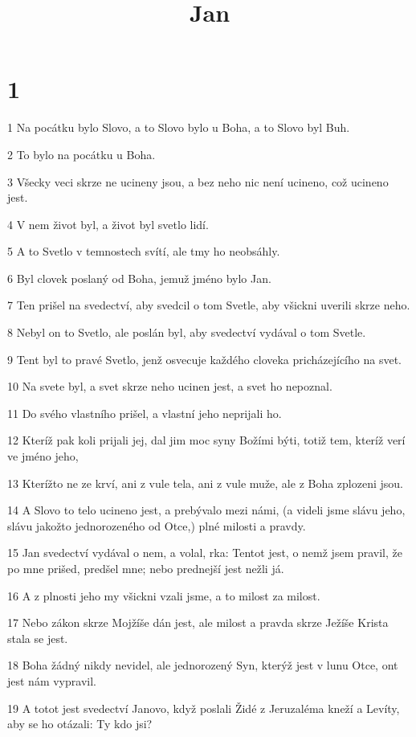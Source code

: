 

\title{Jan}

\chapter{1}

\par 1 Na pocátku bylo Slovo, a to Slovo bylo u Boha, a to Slovo byl Buh.
\par 2 To bylo na pocátku u Boha.
\par 3 Všecky veci skrze ne ucineny jsou, a bez neho nic není ucineno, což ucineno jest.
\par 4 V nem život byl, a život byl svetlo lidí.
\par 5 A to Svetlo v temnostech svítí, ale tmy ho neobsáhly.
\par 6 Byl clovek poslaný od Boha, jemuž jméno bylo Jan.
\par 7 Ten prišel na svedectví, aby svedcil o tom Svetle, aby všickni uverili skrze neho.
\par 8 Nebyl on to Svetlo, ale poslán byl, aby svedectví vydával o tom Svetle.
\par 9 Tent byl to pravé Svetlo, jenž osvecuje každého cloveka pricházejícího na svet.
\par 10 Na svete byl, a svet skrze neho ucinen jest, a svet ho nepoznal.
\par 11 Do svého vlastního prišel, a vlastní jeho neprijali ho.
\par 12 Kteríž pak koli prijali jej, dal jim moc syny Božími býti, totiž tem, kteríž verí ve jméno jeho,
\par 13 Kterížto ne ze krví, ani z vule tela, ani z vule muže, ale z Boha zplozeni jsou.
\par 14 A Slovo to telo ucineno jest, a prebývalo mezi námi, (a videli jsme slávu jeho, slávu jakožto jednorozeného od Otce,) plné milosti a pravdy.
\par 15 Jan svedectví vydával o nem, a volal, rka: Tentot jest, o nemž jsem pravil, že po mne prišed, predšel mne; nebo prednejší jest nežli já.
\par 16 A z plnosti jeho my všickni vzali jsme, a to milost za milost.
\par 17 Nebo zákon skrze Mojžíše dán jest, ale milost a pravda skrze Ježíše Krista stala se jest.
\par 18 Boha žádný nikdy nevidel, ale jednorozený Syn, kterýž jest v lunu Otce, ont jest nám vypravil.
\par 19 A totot jest svedectví Janovo, když poslali Židé z Jeruzaléma kneží a Levíty, aby se ho otázali: Ty kdo jsi?
